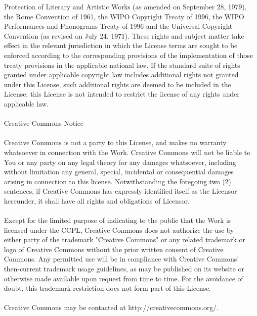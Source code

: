     Protection of Literary and Artistic Works (as amended on September 28,
    1979), the Rome Convention of 1961, the WIPO Copyright Treaty of 1996, the
    WIPO Performances and Phonograms Treaty of 1996 and the Universal Copyright
    Convention (as revised on July 24, 1971). These rights and subject matter
    take effect in the relevant jurisdiction in which the License terms are
    sought to be enforced according to the corresponding provisions of the
    implementation of those treaty provisions in the applicable national law. If
    the standard suite of rights granted under applicable copyright law includes
    additional rights not granted under this License, such additional rights are
    deemed to be included in the License; this License is not intended to
    restrict the license of any rights under applicable law.
\\ \\
    Creative Commons Notice
\\ \\
    Creative Commons is not a party to this License, and makes no warranty
    whatsoever in connection with the Work. Creative Commons will not be liable
    to You or any party on any legal theory for any damages whatsoever,
    including without limitation any general, special, incidental or
    consequential damages arising in connection to this license. Notwithstanding
    the foregoing two (2) sentences, if Creative Commons has expressly
    identified itself as the Licensor hereunder, it shall have all rights and
    obligations of Licensor.
\\ \\
    Except for the limited purpose of indicating to the public that the Work is
    licensed under the CCPL, Creative Commons does not authorize the use by
    either party of the trademark "Creative Commons" or any related trademark or
    logo of Creative Commons without the prior written consent of Creative
    Commons. Any permitted use will be in compliance with Creative Commons'
    then-current trademark usage guidelines, as may be published on its website
    or otherwise made available upon request from time to time. For the
    avoidance of doubt, this trademark restriction does not form part of this
    License.
\\ \\
    Creative Commons may be contacted at http://creativecommons.org/.
